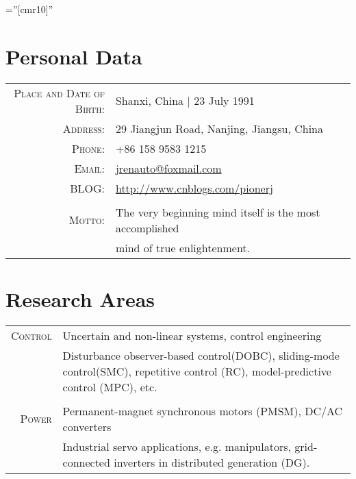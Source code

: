 \documentclass[a4paper,10pt]{article} %
\begin{document}

\font\fb=''[cmr10]'' %


\par{\bigskip\par} %

\section{Personal Data}

\begin{tabular}{rl}
\textsc{Place and Date of Birth:} & Shanxi, China  | 23 July 1991 \\
\textsc{Address:} & 29 Jiangjun Road, Nanjing, Jiangsu, China \\
\textsc{Phone:} & +86 158 9583 1215\\
\textsc{Email:} & \href{mailto:jrenauto@foxmail.com}{jrenauto@foxmail.com}\\
\textsc{BLOG:} & \href{http://www.cnblogs.com/pionerj}{http://www.cnblogs.com/pionerj}\\
&\\
\textsc{Motto:} & The very beginning mind itself is the most accomplished\\
                & mind of true enlightenment.
\end{tabular}


\section{Research Areas}

\begin{tabular}{r|p{11cm}}
\textsc{Control} & Uncertain and non-linear systems, control engineering\\
& \footnotesize{Disturbance observer-based control(DOBC), sliding-mode control(SMC), repetitive control (RC), model-predictive control (MPC), etc.}\\
\multicolumn{2}{c}{} \\


\textsc{Power} & Permanent-magnet synchronous motors (PMSM), DC/AC converters\\
& \footnotesize{Industrial servo applications, e.g. manipulators, grid-connected inverters in distributed generation (DG).}
\end{tabular}
\end{document}
